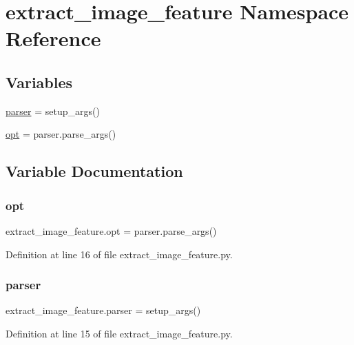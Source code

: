 \hypertarget{namespaceextract__image__feature}{}\section{extract\+\_\+image\+\_\+feature Namespace Reference}
\label{namespaceextract__image__feature}
\subsection*{Variables}
\begin{DoxyCompactItemize}
\item 
\hyperlink{namespaceextract__image__feature_a1e5cbaf17333e7b3a192b412853970f1}{parser} = setup\+\_\+args()
\item 
\hyperlink{namespaceextract__image__feature_a5ee41ae45390d90a69a131d60b829604}{opt} = parser.\+parse\+\_\+args()
\end{DoxyCompactItemize}


\subsection{Variable Documentation}
\mbox{\label{namespaceextract__image__feature_a5ee41ae45390d90a69a131d60b829604}} 
\subsubsection{\texorpdfstring{opt}{opt}}
{\footnotesize\ttfamily extract\+\_\+image\+\_\+feature.\+opt = parser.\+parse\+\_\+args()}



Definition at line 16 of file extract\+\_\+image\+\_\+feature.\+py.

\mbox{\label{namespaceextract__image__feature_a1e5cbaf17333e7b3a192b412853970f1}} 
\subsubsection{\texorpdfstring{parser}{parser}}
{\footnotesize\ttfamily extract\+\_\+image\+\_\+feature.\+parser = setup\+\_\+args()}



Definition at line 15 of file extract\+\_\+image\+\_\+feature.\+py.


